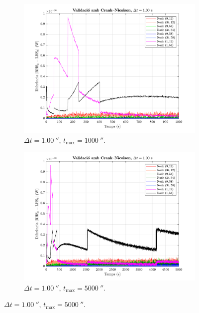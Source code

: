 \begin{figure}[ht]
\begin{subfigure}{.5\textwidth}
	\end{subfigure}
	\begin{subfigure}{.5\textwidth}
		\centering
		\includegraphics[width=.95\linewidth]{imagenes/03_validacio/validacio_03.pdf}
		\vspace{-7pt}
		\caption{$\Delta t = 1.00 \ \second$, $t_\text{max} = 1000 \ \second$.}
		\label{fig:validacio_03}
	\end{subfigure}%
	\begin{subfigure}{.5\textwidth}
		\centering
		\includegraphics[width=.95\linewidth]{imagenes/03_validacio/validacio_04.pdf}
		\vspace{-7pt}
		\caption{$\Delta t = 1.00 \ \second$, $t_\text{max} = 5000 \ \second$.}

\end{subfigure}
\end{figure}
